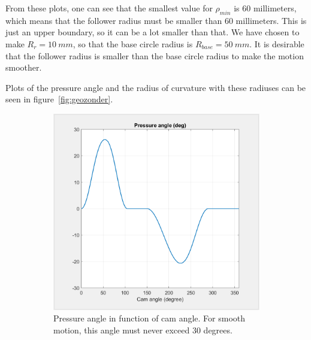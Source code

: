 \documentclass[a4paper]{article}
\begin{document}
From these plots, one can see that the smallest value for \(\rho_{min}\) is 60 millimeters, which means that the follower radius must be smaller than 60 millimeters. This is just an upper boundary, so it can be a lot smaller than that. We have chosen to make \textbf{\(R_r=10~mm\)}, so that the base circle radius is \textbf{\(R_{base}=50~mm\)}. It is desirable that the follower radius is smaller than the base circle radius to make the motion smoother.

Plots of the pressure angle and the radius of curvature with these radiuses can be seen in figure~\ref{fig:geozonder}.

\begin{figure}
	\centering
	
	\begin{subfigure}{.7\textwidth}
		\centering
		\includegraphics[width=\textwidth]{preszonder.png}
		\caption{Pressure angle in function of cam angle. For smooth motion, this angle must never exceed 30 degrees.}
		\label{fig:preszonder}
	\end{subfigure}
	\hfill
	\begin{subfigure}{.7\textwidth}
		\centering

\end{subfigure}
\end{figure}
\end{document}
